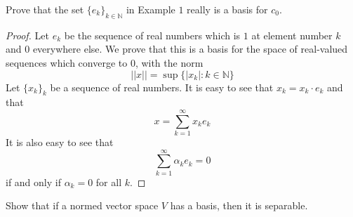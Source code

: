 \begin{prob}
    Prove that the set $\{e_k\}_{k\in\mathbb N}$ in Example $1$ really is a basis for $c_0$.
\end{prob}
\begin{proof}
    Let $e_k$ be the sequence of real numbers which is 
    $1$ at element number $k$ and $0$ everywhere else. We prove 
    that this is a basis for the space of real-valued sequences 
    which converge to $0$, with the norm 
    \[
        ||x|| = \sup\{|x_k| : k\in\mathbb N\}
    \]
    Let $\{x_k\}_k$ be a sequence of real numbers. It is easy to see 
    that $x_k = x_k \cdot e_k$ and that 
    \[
        x = \displaystyle\sum_{k=1}^\infty x_ke_k 
    \]
    It is also easy to see that 
    \[
        \displaystyle\sum_{k=1}^{\infty}\alpha_ke_k = 0
    \]
    if and only if $\alpha_k = 0$ for all $k$.
\end{proof}
\begin{prob}
    Show that if a normed vector space $V$ has a basis, then it is 
    separable.

\end{prob}

